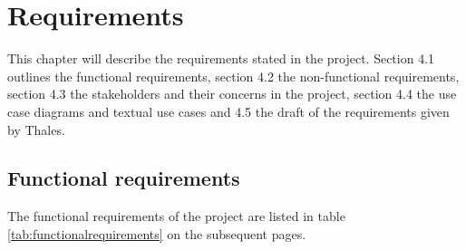 \chapter{Requirements}\label{ch:requirements}

This chapter will describe the requirements stated in the project. Section 4.1 outlines the functional requirements, section 4.2 the non-functional requirements, section 4.3 the stakeholders and their concerns in the project, section 4.4 the use case diagrams and textual use cases and 4.5 the draft of the requirements given by Thales. 

\section{Functional requirements}
The functional requirements of the project are listed in table \ref{tab:functionalrequirements} on the subsequent pages.
